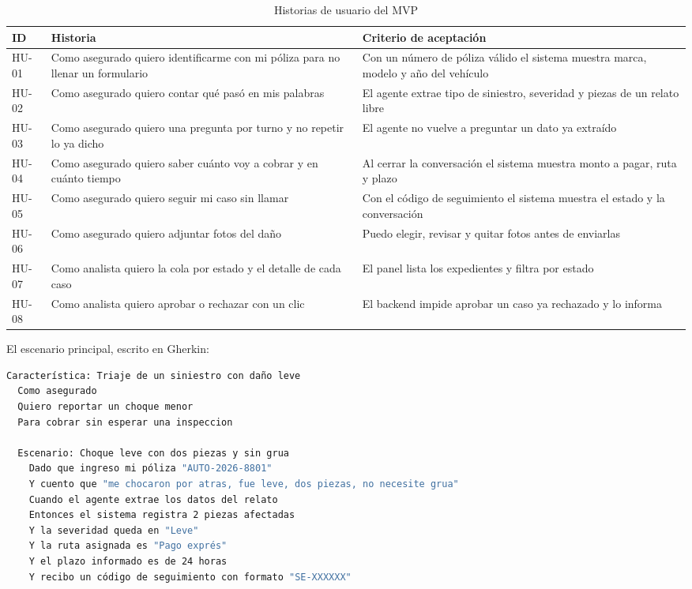 \documentclass[12pt,letterpaper]{article}
\begin{document}
\begin{table}[H]
\centering
\caption{Historias de usuario del MVP}
\label{tab:hu}
\small
\begin{tabular}{p{1.3cm}p{4.6cm}p{7.6cm}}
\toprule
\textbf{ID} & \textbf{Historia} & \textbf{Criterio de aceptación} \\
\midrule
HU-01 & Como asegurado quiero identificarme con mi póliza para no llenar un formulario &
Con un número de póliza válido el sistema muestra marca, modelo y año del vehículo \\
\addlinespace
HU-02 & Como asegurado quiero contar qué pasó en mis palabras &
El agente extrae tipo de siniestro, severidad y piezas de un relato libre \\
\addlinespace
HU-03 & Como asegurado quiero una pregunta por turno y no repetir lo ya dicho &
El agente no vuelve a preguntar un dato ya extraído \\
\addlinespace
HU-04 & Como asegurado quiero saber cuánto voy a cobrar y en cuánto tiempo &
Al cerrar la conversación el sistema muestra monto a pagar, ruta y plazo \\
\addlinespace
HU-05 & Como asegurado quiero seguir mi caso sin llamar &
Con el código de seguimiento el sistema muestra el estado y la conversación \\
\addlinespace
HU-06 & Como asegurado quiero adjuntar fotos del daño &
Puedo elegir, revisar y quitar fotos antes de enviarlas \\
\addlinespace
HU-07 & Como analista quiero la cola por estado y el detalle de cada caso &
El panel lista los expedientes y filtra por estado \\
\addlinespace
HU-08 & Como analista quiero aprobar o rechazar con un clic &
El backend impide aprobar un caso ya rechazado y lo informa \\
\bottomrule
\end{tabular}
\end{table}

El escenario principal, escrito en Gherkin:

\begin{lstlisting}[language=bash, caption={Escenario de pago exprés}, label={lst:gherkin1}]
Característica: Triaje de un siniestro con daño leve
  Como asegurado
  Quiero reportar un choque menor
  Para cobrar sin esperar una inspeccion

  Escenario: Choque leve con dos piezas y sin grua
    Dado que ingreso mi póliza "AUTO-2026-8801"
    Y cuento que "me chocaron por atras, fue leve, dos piezas, no necesite grua"
    Cuando el agente extrae los datos del relato
    Entonces el sistema registra 2 piezas afectadas
    Y la severidad queda en "Leve"
    Y la ruta asignada es "Pago exprés"
    Y el plazo informado es de 24 horas
    Y recibo un código de seguimiento con formato "SE-XXXXXX"
\end{lstlisting}
\end{document}
